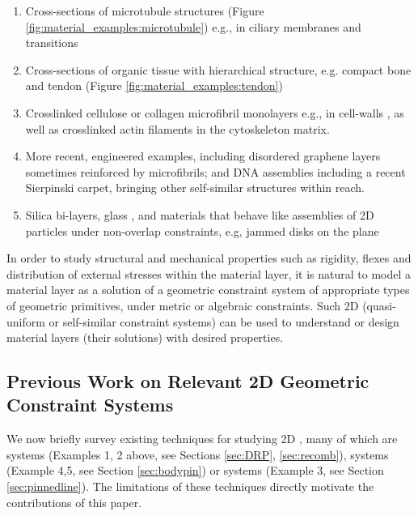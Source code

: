 \begin{enumerate}
    \item Cross-sections of microtubule structures (Figure \ref{fig:material_examples:microtubule}) \cite{Necklace1} e.g., in ciliary membranes and transitions \cite{Necklace2}

    \item Cross-sections of organic tissue with hierarchical structure, e.g. compact bone and tendon (Figure \ref{fig:material_examples:tendon}) \uncited

    \item Crosslinked cellulose or collagen microfibril monolayers e.g., in cell-walls \cite{CellWalls1} \cite{CellWalls1}, as well as crosslinked actin filaments in the cytoskeleton matrix.

    \item More recent, engineered examples, including disordered graphene layers \cite{Graphene1} \cite{Graphene2} sometimes reinforced by  microfibrils; and DNA assemblies \cite{Microfibrils1} including a recent Sierpinski carpet, bringing other self-similar structures \cite{Microfibrils2} within reach.

    \item Silica bi-layers, glass \cite{SilicaGlass1} \cite{SilicaGlass2}, and materials that behave like assemblies of 2D particles under non-overlap constraints, e.g, jammed disks on the plane \cite{JammedDisk1}
\end{enumerate}
%
In order to study structural and mechanical properties such as
rigidity, flexes and distribution of external stresses within the
material layer, it is natural to model a material layer as a solution
of a geometric constraint system of appropriate types of geometric
primitives, under metric or algebraic constraints. Such 2D
 (quasi-uniform or self-similar constraint systems) can be
used to understand or design material layers (their solutions) with
desired properties.

\subsection{Previous Work on Relevant 2D Geometric Constraint Systems}
We now briefly survey existing techniques for studying 2D
,  many of which are  systems
(Examples 1, 2 above, see Sections \ref{sec:DRP}, \ref{sec:recomb}),
 systems (Example 4,5, see Section
\ref{sec:bodypin}) or  systems (Example
3, see Section \ref{sec:pinnedline}). The limitations of these
techniques directly motivate the contributions of this paper.

